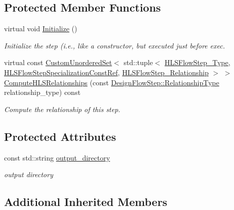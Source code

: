 \subsection*{Protected Member Functions}
\begin{DoxyCompactItemize}
\item 
virtual void \hyperlink{classTestbenchValuesCGeneration_a9cd290bc7ce4f2ada56343231d3341e2}{Initialize} ()
\begin{DoxyCompactList}\small\item\em Initialize the step (i.\+e., like a constructor, but executed just before exec. \end{DoxyCompactList}\item 
virtual const \hyperlink{classCustomUnorderedSet}{Custom\+Unordered\+Set}$<$ std\+::tuple$<$ \hyperlink{hls__step_8hpp_ada16bc22905016180e26fc7e39537f8d}{H\+L\+S\+Flow\+Step\+\_\+\+Type}, \hyperlink{hls__step_8hpp_a5fdd2edf290c196531d21d68e13f0e74}{H\+L\+S\+Flow\+Step\+Specialization\+Const\+Ref}, \hyperlink{hls__step_8hpp_a3ad360b9b11e6bf0683d5562a0ceb169}{H\+L\+S\+Flow\+Step\+\_\+\+Relationship} $>$ $>$ \hyperlink{classTestbenchValuesCGeneration_a7fd5ad85b75db2cc5f4acc4beb27c698}{Compute\+H\+L\+S\+Relationships} (const \hyperlink{classDesignFlowStep_a723a3baf19ff2ceb77bc13e099d0b1b7}{Design\+Flow\+Step\+::\+Relationship\+Type} relationship\+\_\+type) const
\begin{DoxyCompactList}\small\item\em Compute the relationship of this step. \end{DoxyCompactList}\end{DoxyCompactItemize}
\subsection*{Protected Attributes}
\begin{DoxyCompactItemize}
\item 
const std\+::string \hyperlink{classTestbenchValuesCGeneration_a3777686786b90a1ccf6553e7da012427}{output\+\_\+directory}
\begin{DoxyCompactList}\small\item\em output directory \end{DoxyCompactList}\end{DoxyCompactItemize}
\subsection*{Additional Inherited Members}


